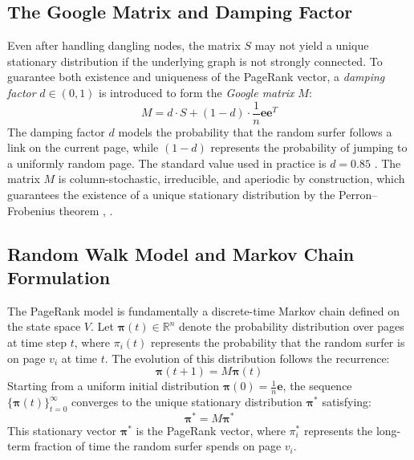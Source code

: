 \documentclass[conference]{IEEEtran}
\begin{document}
\subsection{The Google Matrix and Damping Factor}
Even after handling dangling nodes, the matrix $S$ may not yield a unique stationary distribution if the underlying graph is not strongly connected. To guarantee both existence and uniqueness of the PageRank vector, a \textit{damping factor} $d \in (0, 1)$ is introduced to form the \textit{Google matrix} $M$:
\begin{equation}
M = d \cdot S + (1 - d) \cdot \frac{1}{n} \mathbf{e} \mathbf{e}^T
\end{equation}
The damping factor $d$ models the probability that the random surfer follows a link on the current page, while $(1 - d)$ represents the probability of jumping to a uniformly random page. The standard value used in practice is $d = 0.85$ \cite{b1}. The matrix $M$ is column-stochastic, irreducible, and aperiodic by construction, which guarantees the existence of a unique stationary distribution by the Perron--Frobenius theorem \cite{b4}, \cite{b6}.

\subsection{Random Walk Model and Markov Chain Formulation}
The PageRank model is fundamentally a discrete-time Markov chain defined on the state space $V$. Let $\boldsymbol{\pi}(t) \in \mathbb{R}^n$ denote the probability distribution over pages at time step $t$, where $\pi_i(t)$ represents the probability that the random surfer is on page $v_i$ at time $t$. The evolution of this distribution follows the recurrence:
\begin{equation}
\boldsymbol{\pi}(t+1) = M \boldsymbol{\pi}(t)
\end{equation}
Starting from a uniform initial distribution $\boldsymbol{\pi}(0) = \frac{1}{n} \mathbf{e}$, the sequence $\{\boldsymbol{\pi}(t)\}_{t=0}^{\infty}$ converges to the unique stationary distribution $\boldsymbol{\pi}^*$ satisfying:
\begin{equation}
\boldsymbol{\pi}^* = M \boldsymbol{\pi}^*
\end{equation}
This stationary vector $\boldsymbol{\pi}^*$ is the PageRank vector, where $\pi_i^*$ represents the long-term fraction of time the random surfer spends on page $v_i$.
\end{document}
